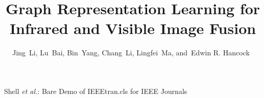 \documentclass[journal]{IEEEtran}
\begin{document}
%


\title{Graph Representation Learning for Infrared and Visible Image Fusion}




%

\author{Jing~Li, Lu~Bai, Bin~Yang, Chang~Li, Lingfei~Ma, and~Edwin R. Hancock~ %
}

% 
%



%
{Shell \MakeLowercase{\textit{et al.}}: Bare Demo of IEEEtran.cls for IEEE Journals}
% 
\end{document}
